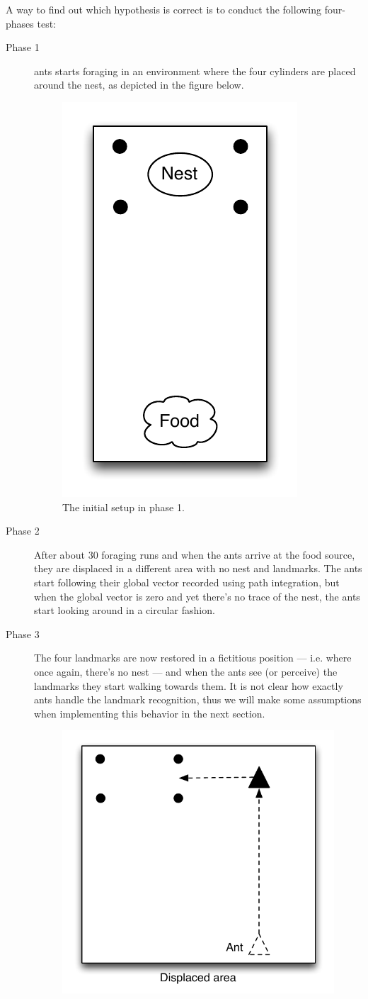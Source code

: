 \documentclass[11pt]{article}
\begin{document}
A way to find out which hypothesis is correct is to conduct the following four-phases test:
\begin{description}
\item[Phase 1] ants starts foraging in an environment where the four cylinders are placed around the nest, as depicted in the figure below.
\begin{figure}[h!]
  \centering
    \includegraphics[width=.25\textwidth]{images/phase1}
     \caption{The initial setup in phase 1.}
\end{figure}
\item[Phase 2] After about 30 foraging runs and when the ants arrive at the food source, they are displaced in a different area with no nest and landmarks. The ants start following their global vector recorded using path integration, but when the global vector is zero and yet there's no trace of the nest, the ants start looking around in a circular fashion.
\item[Phase 3] The four landmarks are now restored in a fictitious position --- i.e. where once again, there's no nest --- and when the ants see (or perceive) the landmarks they start walking towards them. It is not clear how exactly ants handle the landmark recognition, thus we will make some assumptions when implementing this behavior in the next section.
\begin{figure}[h!]
  \centering
    \includegraphics[width=.5\textwidth]{images/phase3}

\end{figure}
\end{description}
\end{document}
